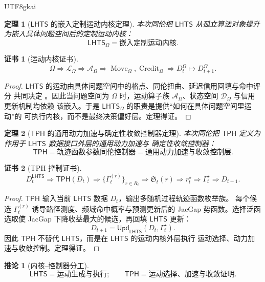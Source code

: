 \documentclass[12pt]{article}
\newtheorem{theorem}{定理}[section]
\newtheorem{corollary}{推论}[section]
\newtheorem{Certificate}{证书}[section]
\newcommand{\LHTS}{\ensuremath{\mathsf{LHTS}}}
\newcommand{\TPH}{\ensuremath{\mathsf{TPH}}}
\DeclareMathOperator{\Move}{Move}
\DeclareMathOperator{\Credit}{Credit}
\begin{document}
\begin{CJK*}{UTF8}{gkai}
\begin{theorem}[\(\LHTS\) 的嵌入定制运动内核定理]
本次同伦把 \(\LHTS\) 从孤立算法对象提升为嵌入具体问题空间后的定制运动内核：
\[
\boxed{
\LHTS_\Omega
=
\text{嵌入定制运动内核}.
}
\]
\end{theorem}

\begin{Certificate}[运动内核证书]
\[
\boxed{
\Omega
\Rightarrow
\mathcal L_\Omega
\Rightarrow
\mathcal A_\Omega
\Rightarrow
\Move_\Omega,\Credit_\Omega
\Rightarrow
D_t^\Omega\mapsto D_{t+1}^\Omega.
}
\]
\end{Certificate}

\begin{proof}
\(\LHTS\) 的运动由具体问题空间中的格点、同伦扭曲、延迟信用回填与命中评分
共同决定 \cite{RepoTex56LHTS}。因此当问题空间为 \(\Omega\) 时，运动算子族
\(\mathcal A_\Omega\)、状态空间 \(\mathcal D_\Omega\) 与信用更新机制均依赖
该嵌入。于是 \(\LHTS_\Omega\) 的职责是提供“如何在具体问题空间里运动”的
可执行内核，而不是最终决策偏好层。定理得证。
\end{proof}

\begin{theorem}[\(\TPH\) 的通用动力加速与确定性收敛控制器定理]
本次同伦把 \(\TPH\) 定义为作用于 \(\LHTS\) 数据接口外层的通用动力加速与
确定性收敛控制器：
\[
\boxed{
\TPH
=
\text{轨迹函数参数同伦控制器}
=
\text{通用动力加速与收敛控制层}.
}
\]
\end{theorem}

\begin{Certificate}[TPH 控制证书]
\[
\boxed{
D_t^{\LHTS}
\Rightarrow
\TPH(D_t)
\Rightarrow
\{\Gamma_t^{(r)}\}_{r\in R_t}
\Rightarrow
\mathfrak S_t(r)
\Rightarrow
r_t^\star
\Rightarrow
\Gamma_t^\star
\Rightarrow
D_{t+1}.
}
\]
\end{Certificate}

\begin{proof}
\(\TPH\) 输入当前 \(\LHTS\) 数据 \(D_t\)，输出多随机过程轨迹函数枚举族。
每个候选 \(\Gamma_t^{(r)}\) 诱导路径测度、频域命中概率与预测更新后的
JacGap 势函数。选择泛函选取使 JacGap 下降收益最大的候选，再回填
\(\LHTS\) 更新：
\[
D_{t+1}
=
\mathsf{Upd}_{\LHTS}(D_t,\Gamma_t^\star).
\]
因此 \(\TPH\) 不替代 \(\LHTS\)，而是在 \(\LHTS\) 的运动内核外层执行
运动选择、动力加速与收敛控制。定理得证。
\end{proof}

\begin{corollary}[内核--控制器分工]
\[
\boxed{
\LHTS
=
\text{运动生成与执行};
\qquad
\TPH
=
\text{运动选择、加速与收敛证明}.
}
\]
\end{corollary}


\end{CJK*}
\end{document}
